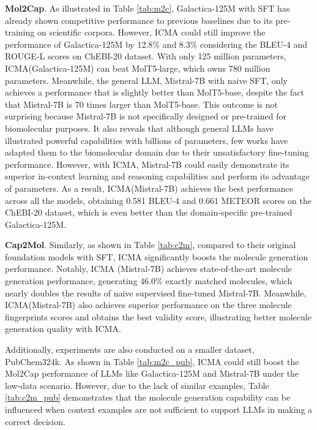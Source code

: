 \noindent\textbf{Mol2Cap}. As illustrated in Table \ref{tab:m2c}, Galactica-125M with SFT has already shown competitive performance to previous baselines due to its pre-training on scientific corpora. However, ICMA could still improve the performance of Galactica-125M by 12.8\% and 8.3\% considering the BLEU-4 and ROUGE-L scores on ChEBI-20 dataset. With only 125 million parameters, ICMA(Galactica-125M) can beat MolT5-large, which owns 780 million parameters.
Meanwhile, the general LLM, Mistral-7B with naive SFT, only achieves a performance that is slightly better than MolT5-base, despite the fact that Mistral-7B is 70 times larger than MolT5-base. 
This outcome is not surprising because Mistral-7B is not specifically designed or pre-trained for biomolecular purposes.
It also reveals that although general LLMs have illustrated powerful capabilities with billions of parameters, few works have adapted them to the biomolecular domain due to their unsatisfactory fine-tuning performance. 
However, with ICMA, Mistral-7B could easily demonstrate its superior in-context learning and reasoning capabilities and perform its advantage of parameters.
As a result, ICMA(Mistral-7B) achieves the best performance across all the models, obtaining 0.581 BLEU-4 and 0.661 METEOR scores on the ChEBI-20 dataset, which is even better than the domain-specific pre-trained Galactica-125M.

\noindent\textbf{Cap2Mol}. Similarly, as shown in Table \ref{tab:c2m}, compared to their original foundation models with SFT, ICMA significantly boosts the molecule generation performance. Notably, ICMA (Mistral-7B) achieves state-of-the-art molecule generation performance, generating 46.0\% exactly matched molecules, which nearly doubles the results of naive supervised fine-tuned Mistral-7B. Meanwhile, ICMA(Mistral-7B) also achieves superior performance on the three molecule fingerprints scores and obtains the best validity score, illustrating better molecule generation quality with ICMA.

Additionally, experiments are also conducted on a smaller dataset, PubChem324k. As shown in Table \ref{tab:m2c_pub}, ICMA could still boost the Mol2Cap performance of LLMs like Galactica-125M and Mistral-7B under the low-data scenario. However, due to the lack of similar examples, Table \ref{tab:c2m_pub} demonstrates that the molecule generation capability can be influenced when context examples are not sufficient to support LLMs in making a correct decision.

